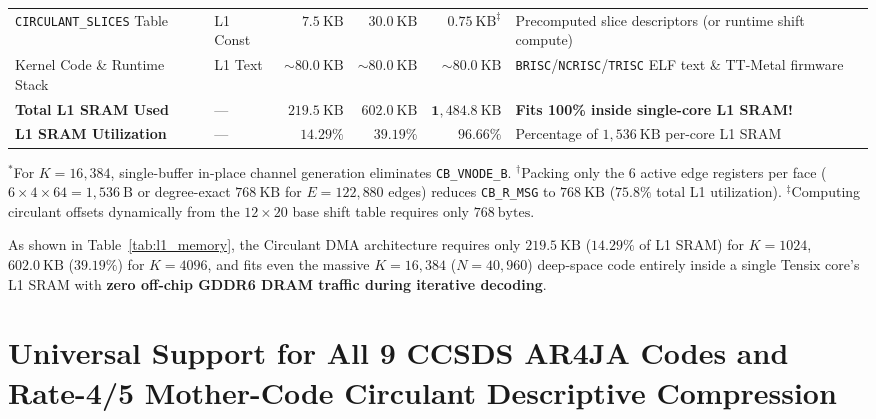 \documentclass[10pt]{article}
\begin{document}
\begin{table}[!htbp]
{\begin{tabular}{@{}l l r r r p{6.8cm}@{}}
\texttt{CIRCULANT\_SLICES} Table & L1 Const & $7.5\ \mathrm{KB}$ & $30.0\ \mathrm{KB}$ & $0.75\ \mathrm{KB}^\ddagger$ & Precomputed slice descriptors (or runtime shift compute) \\
Kernel Code \& Runtime Stack & L1 Text & $\sim 80.0\ \mathrm{KB}$ & $\sim 80.0\ \mathrm{KB}$ & $\sim 80.0\ \mathrm{KB}$ & \texttt{BRISC}/\texttt{NCRISC}/\texttt{TRISC} ELF text \& TT-Metal firmware \\
\midrule
\textbf{Total L1 SRAM Used} & --- & $\mathbf{219.5\ \mathrm{KB}}$ & $\mathbf{602.0\ \mathrm{KB}}$ & $\mathbf{1,484.8\ \mathrm{KB}}$ & \textbf{Fits 100\% inside single-core L1 SRAM!} \\
\textbf{L1 SRAM Utilization} & --- & $\mathbf{14.29\%}$ & $\mathbf{39.19\%}$ & $\mathbf{96.66\%}$ & Percentage of $1,536\ \mathrm{KB}$ per-core L1 SRAM \\
\bottomrule
\end{tabular}%
}
\vspace{2pt}
\footnotesize{\raggedright $^*$For $K=16,384$, single-buffer in-place channel generation eliminates \texttt{CB\_VNODE\_B}. $^\dagger$Packing only the 6 active edge registers per face ($6 \times 4 \times 64 = 1,536\ \mathrm{B}$ or degree-exact $768\ \mathrm{KB}$ for $E=122,880$ edges) reduces \texttt{CB\_R\_MSG} to $768\ \mathrm{KB}$ ($75.8\%$ total L1 utilization). $^\ddagger$Computing circulant offsets dynamically from the $12 \times 20$ base shift table requires only $768\ \mathrm{bytes}$.\par}
\end{table}

As shown in Table~\ref{tab:l1_memory}, the Circulant DMA architecture requires only $\mathbf{219.5\ \mathrm{KB}}$ ($\mathbf{14.29\%}$ of L1 SRAM) for $K=1024$, $\mathbf{602.0\ \mathrm{KB}}$ ($\mathbf{39.19\%}$) for $K=4096$, and fits even the massive $K=16,384$ ($N=40,960$) deep-space code entirely inside a single Tensix core's L1 SRAM with \textbf{zero off-chip GDDR6 DRAM traffic during iterative decoding}.

\section{Universal Support for All 9 CCSDS AR4JA Codes and Rate-4/5 Mother-Code Circulant Descriptive Compression}
\label{sec:all_9_codes_mother_compression}
\end{document}
